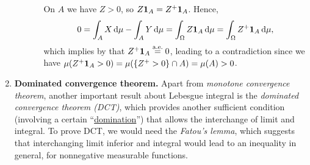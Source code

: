 \begin{enumerate}
\begin{pf}
\begin{enumerate}
\begin{itemize}
On \(A\) we have \(Z>0\), so \(Z\mathbf{1}_{A}=Z^{+}\mathbf{1}_{A}\). Hence,
\[0=\int_{A}^{}X\odif{\mu}-\int_{A}^{}Y\odif{\mu}
=\int_{\Omega}^{}Z\indic_{A}\odif{\mu}
=\int_{\Omega}^{}Z^{+}\indic_{A}\odif{\mu},
\]
which implies by  that \(Z^{+}\mathbf{1}_{A}\overset{\text{a.e.}}=
0\), leading to a contradiction since we have \(\mu(Z^{+}\mathbf{1}_{A}>0)
=\mu(\{Z^{+}>0\}\cap A)=\mu(A)>0\).
\end{itemize}
\end{enumerate}
\end{pf}
\item \textbf{Dominated convergence theorem.} Apart from \emph{monotone
convergence theorem}, another important result about Lebesgue integral is the
\emph{dominated convergence theorem (DCT)}, which provides another sufficient
condition (involving a certain ``\underline{domination}'') that allows the
interchange of limit and integral. To prove DCT, we would need the
\emph{Fatou's lemma}, which suggests that interchanging limit inferior and
integral would lead to an inequality in general, for nonnegative measurable
functions.


\end{enumerate}
